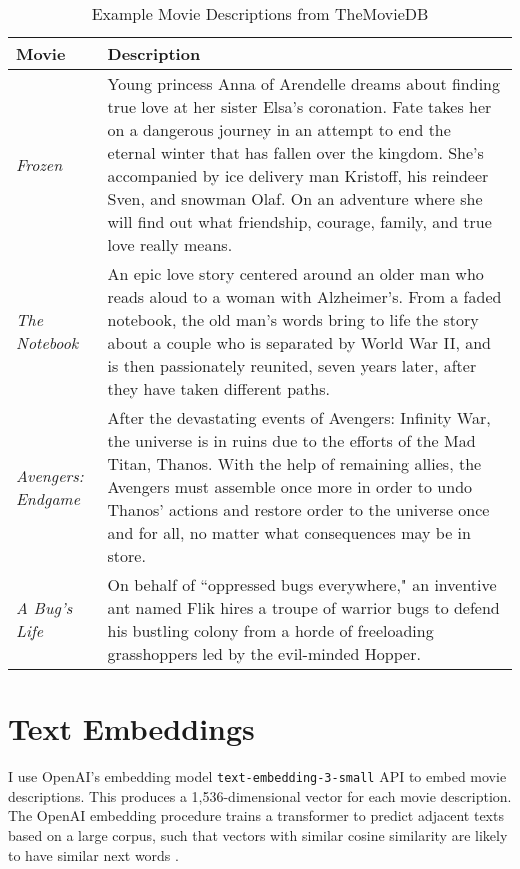 \documentclass{article}
\begin{document}
\begin{table}
    \begin{tabular}{lp{11cm}}
        \toprule 
        \textbf{Movie} & \textbf{Description} \\
        \midrule
        \emph{Frozen} & Young princess Anna of Arendelle dreams about finding true love at her sister Elsa’s coronation. Fate takes her on a dangerous journey in an attempt to end the eternal winter that has fallen over the kingdom. She's accompanied by ice delivery man Kristoff, his reindeer Sven, and snowman Olaf. On an adventure where she will find out what friendship, courage, family, and true love really means. \\
        \emph{The Notebook} & An epic love story centered around an older man who reads aloud to a woman with Alzheimer's. From a faded notebook, the old man's words bring to life the story about a couple who is separated by World War II, and is then passionately reunited, seven years later, after they have taken different paths. \\
        \emph{Avengers: Endgame} & After the devastating events of Avengers: Infinity War, the universe is in ruins due to the efforts of the Mad Titan, Thanos. With the help of remaining allies, the Avengers must assemble once more in order to undo Thanos' actions and restore order to the universe once and for all, no matter what consequences may be in store. \\
        \emph{A Bug's Life} & On behalf of ``oppressed bugs everywhere," an inventive ant named Flik hires a troupe of warrior bugs to defend his bustling colony from a horde of freeloading grasshoppers led by the evil-minded Hopper. \\
        \bottomrule
    \end{tabular} 
    \caption{Example Movie Descriptions from TheMovieDB}
    \label{tab:tmdb_desc}
\end{table}

\section{Text Embeddings}

I use OpenAI's embedding model \texttt{text-embedding-3-small} API to embed movie descriptions. This produces a 1,536-dimensional vector for each movie description. The OpenAI embedding procedure trains a transformer to predict adjacent texts based on a large corpus, such that vectors with similar cosine similarity are likely to have similar next words \parencite{neelakantan2022ao, kusupati2022ao}.
\end{document}
